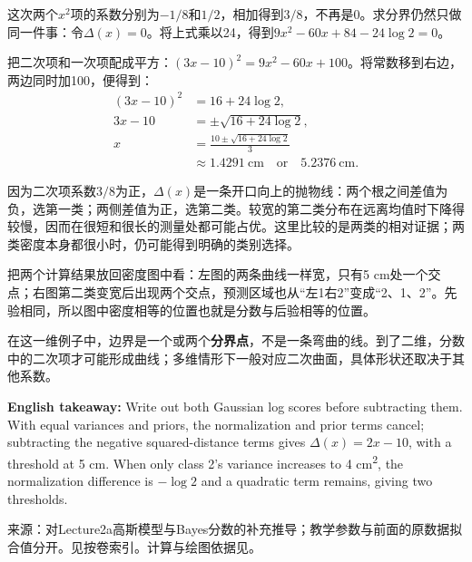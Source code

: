 这次两个\(x^2\)项的系数分别为\(-1/8\)和\(1/2\)，相加得到\(3/8\)，不再是0。求分界仍然只做同一件事：令\(\Delta(x)=0\)。将上式乘以24，得到\(9x^2-60x+84-24\log2=0\)。


把二次项和一次项配成平方：\((3x-10)^2=9x^2-60x+100\)。将常数移到右边，两边同时加100，便得到：
\[
\begin{aligned}
(3x-10)^2&=16+24\log2,\\
3x-10&=\pm\sqrt{16+24\log2},\\
x&=\frac{10\pm\sqrt{16+24\log2}}{3}\\
&\approx1.4291\ \text{cm}\quad\text{or}\quad5.2376\ \text{cm}.
\end{aligned}
\tag{2.14c}
\]


因为二次项系数\(3/8\)为正，\(\Delta(x)\)是一条开口向上的抛物线：两个根之间差值为负，选第一类；两侧差值为正，选第二类。较宽的第二类分布在远离均值时下降得较慢，因而在很短和很长的测量处都可能占优。这里比较的是两类的相对证据；两类密度本身都很小时，仍可能得到明确的类别选择。


把两个计算结果放回密度图中看：左图的两条曲线一样宽，只有5 cm处一个交点；右图第二类变宽后出现两个交点，预测区域也从“左1右2”变成“2、1、2”。先验相同，所以图中密度相等的位置也就是分数与后验相等的位置。






在这一维例子中，边界是一个或两个\textbf{分界点}，不是一条弯曲的线。到了二维，分数中的二次项才可能形成曲线；多维情形下一般对应二次曲面，具体形状还取决于其他系数。


\textbf{English takeaway:} Write out both Gaussian log scores before subtracting them. With equal variances and priors, the normalization and prior terms cancel; subtracting the negative squared-distance terms gives \(\Delta(x)=2x-10\), with a threshold at 5 cm. When only class 2's variance increases to 4 cm\textsuperscript{2}, the normalization difference is \(-\log2\) and a quadratic term remains, giving two thresholds.


来源：对Lecture2a高斯模型与Bayes分数的补充推导；教学参数与前面的原数据拟合值分开。见按卷索引。计算与绘图依据见。






